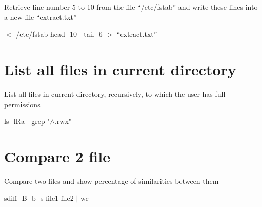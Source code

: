 \documentclass[article, paper=a4, fontsize=11pt]{scrartcl}
\begin{document}
Retrieve line number 5 to 10 from the file “/etc/fstab” and
write these lines into a new file “extract.txt”

$<$ /etc/fstab head -10 $\mid$ tail -6 $>$ “extract.txt”

\section{List all files in current directory}

List all files in current directory, recursively, to which the user has full permissions

ls -lRa $\mid$ grep "$\land$.rwx"

\section{Compare 2 file}

Compare two files and show percentage of similarities between them

sdiff -B -b -s file1 file2 $\mid$ wc
\end{document}
